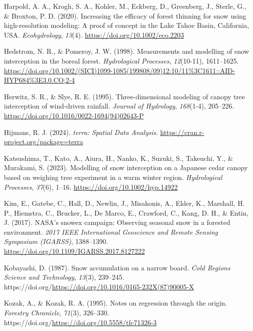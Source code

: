 \documentclass[
  letterpaper,
  DIV=11,
  numbers=noendperiod]{scrartcl}
\newlength{\cslhangindent}
\newenvironment{CSLReferences}[2] %
 {\begin{list}{}{%
  \setlength{\itemindent}{0pt}
  \setlength{\leftmargin}{0pt}
  \setlength{\parsep}{0pt}
  \ifodd #1
   \setlength{\leftmargin}{\cslhangindent}
   \setlength{\itemindent}{-1\cslhangindent}
  \fi
  \setlength{\itemsep}{#2\baselineskip}}}
 {\end{list}}
\begin{document}
\begin{CSLReferences}{1}{0}
Harpold, A. A., Krogh, S. A., Kohler, M., Eckberg, D., Greenberg, J.,
Sterle, G., \& Broxton, P. D. (2020). {Increasing the efficacy of forest
thinning for snow using high-resolution modeling: A proof of concept in
the Lake Tahoe Basin, California, USA}. \emph{Ecohydrology},
\emph{13}(4). \url{https://doi.org/10.1002/eco.2203}

Hedstrom, N. R., \& Pomeroy, J. W. (1998). {Measurements and modelling
of snow interception in the boreal forest}. \emph{Hydrological
Processes}, \emph{12}(10-11), 1611--1625.
\url{https://doi.org/10.1002/(SICI)1099-1085(199808/09)12:10/11\%3C1611::AID-HYP684\%3E3.0.CO;2-4}

Herwitz, S. R., \& Slye, R. E. (1995). {Three-dimensional modeling of
canopy tree interception of wind-driven rainfall}. \emph{Journal of
Hydrology}, \emph{168}(1-4), 205--226.
\url{https://doi.org/10.1016/0022-1694(94)02643-P}

Hijmans, R. J. (2024). \emph{{terra: Spatial Data Analysis}}.
\url{https://cran.r-project.org/package=terra}

Katsushima, T., Kato, A., Aiura, H., Nanko, K., Suzuki, S., Takeuchi,
Y., \& Murakami, S. (2023). {Modelling of snow interception on a
Japanese cedar canopy based on weighing tree experiment in a warm winter
region}. \emph{Hydrological Processes}, \emph{37}(6), 1--16.
\url{https://doi.org/10.1002/hyp.14922}

Kim, E., Gatebe, C., Hall, D., Newlin, J., Misakonis, A., Elder, K.,
Marshall, H. P., Hiemstra, C., Brucker, L., De Marco, E., Crawford, C.,
Kang, D. H., \& Entin, J. (2017). {NASA's snowex campaign: Observing
seasonal snow in a forested environment}. \emph{2017 IEEE International
Geoscience and Remote Sensing Symposium (IGARSS)}, 1388--1390.
\url{https://doi.org/10.1109/IGARSS.2017.8127222}

Kobayashi, D. (1987). {Snow accumulation on a narrow board}. \emph{Cold
Regions Science and Technology}, \emph{13}(3), 239--245.
https://doi.org/\url{https://doi.org/10.1016/0165-232X(87)90005-X}

Kozak, A., \& Kozak, R. A. (1995). {Notes on regression through the
origin}. \emph{Forestry Chronicle}, \emph{71}(3), 326--330.
https://doi.org/\url{https://doi.org/10.5558/tfc71326-3}


\end{CSLReferences}
\end{document}
